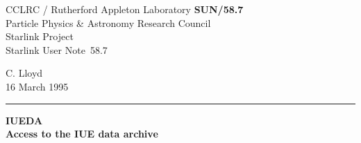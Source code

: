 \documentclass[11pt,twoside]{article}
\newcommand{\stardoccategory}  {Starlink User Note}
\newcommand{\stardocinitials}  {SUN}
\newcommand{\stardocnumber}    {58.7}
\newcommand{\stardocauthors}   {C. Lloyd}
\newcommand{\stardocdate}      {16 March 1995}
\newcommand{\stardoctitle}     {IUEDA\\[2ex]
                               Access to the IUE data archive}
\newcommand{\stardocname}{\stardocinitials /\stardocnumber}
\newenvironment{latexonly}{}{}
\begin{document}
\thispagestyle{empty}

\begin{latexonly}
   CCLRC / {\sc Rutherford Appleton Laboratory} \hfill {\bf \stardocname}\\
   {\large Particle Physics \& Astronomy Research Council}\\
   {\large Starlink Project\\}
   {\large \stardoccategory\ \stardocnumber}
   \begin{flushright}
   \stardocauthors\\
   \stardocdate
   \end{flushright}
   \vspace{-4mm}
   \rule{\textwidth}{0.5mm}
   \vspace{5mm}
   \begin{center}
   {\Huge\bf  \stardoctitle}
   \end{center}
   \vspace{5mm}

\end{latexonly}
\end{document}
